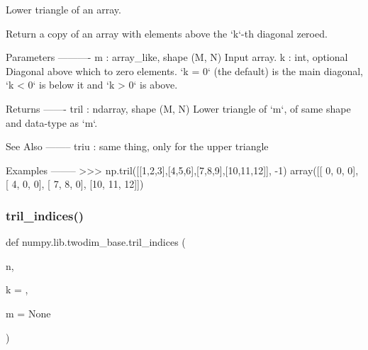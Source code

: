 \begin{DoxyVerb}Lower triangle of an array.

Return a copy of an array with elements above the `k`-th diagonal zeroed.

Parameters
----------
m : array_like, shape (M, N)
    Input array.
k : int, optional
    Diagonal above which to zero elements.  `k = 0` (the default) is the
    main diagonal, `k < 0` is below it and `k > 0` is above.

Returns
-------
tril : ndarray, shape (M, N)
    Lower triangle of `m`, of same shape and data-type as `m`.

See Also
--------
triu : same thing, only for the upper triangle

Examples
--------
>>> np.tril([[1,2,3],[4,5,6],[7,8,9],[10,11,12]], -1)
array([[ 0,  0,  0],
       [ 4,  0,  0],
       [ 7,  8,  0],
       [10, 11, 12]])\end{DoxyVerb}
 \mbox{\label{namespacenumpy_1_1lib_1_1twodim__base_a2b716112412d6d2a7d5c6d62479ab0f8}} 
\subsubsection{\texorpdfstring{tril\+\_\+indices()}{tril\_indices()}}
{\footnotesize\ttfamily def numpy.\+lib.\+twodim\+\_\+base.\+tril\+\_\+indices (\begin{DoxyParamCaption}\item[{}]{n,  }\item[{}]{k = {},  }\item[{}]{m = {\ttfamily None} }\end{DoxyParamCaption})}

